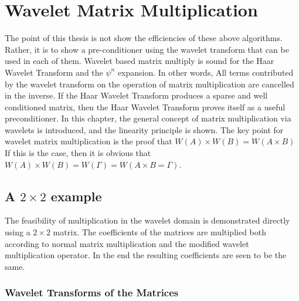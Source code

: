 \section {Wavelet Matrix Multiplication}
The point of this thesis is not show the efficiencies of these above algorithms.  Rather, it is to show a pre-conditioner using the wavelet transform that can be used in each of them.  %
Wavelet based matrix multiply is sound for the Haar Wavelet Transform and the $\psi^n$ expansion.   In other words, All terms contributed by the wavelet transform on the operation of matrix multiplication are cancelled in the inverse.
If the Haar Wavelet Transform produces a sparse and well conditioned matrix, then the Haar Wavelet Transform proves itself as a useful preconditioner.  %
In this chapter, the general concept of matrix multiplication via wavelets is introduced, and the linearity principle is shown.  
The key point for wavelet matrix multiplication is the proof that $W(A) \times W(B) = W(A\times B)$  If this is the case, then it is obvious that $W(A) \times W(B) = W(\Gamma) = W(A\times B = \Gamma)$.  %



\subsection{A $2\times 2$ example}

The feasibility of multiplication in the wavelet domain is demonstrated directly using a $2 \times 2$ matrix. The coefficients of the matrices are multiplied both according to normal matrix multiplication and the modified wavelet multiplication operator. In the end the resulting coefficients are seen to be the same.

\subsubsection{Wavelet Transforms of the Matrices}

